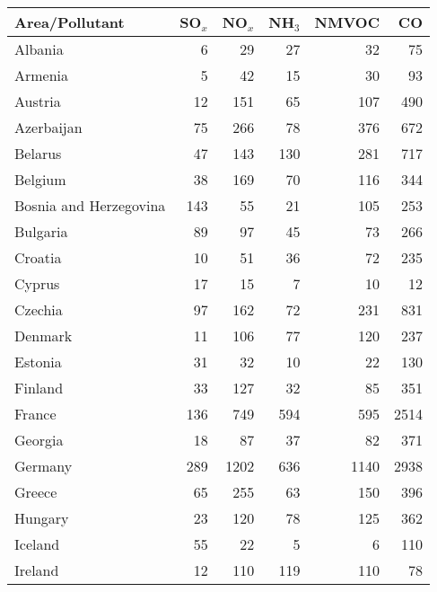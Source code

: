 \begin{table}
\begin{center}
\scriptsize
\begin{tabular}{|l|r|r|r|r|r|}
\hline
 Area/Pollutant&SO$_x$&NO$_x$&NH$_3$&NMVOC&CO\\\hline\hline
                       Albania&     6&    29&    27&    32&    75 \\\hline
                       Armenia&     5&    42&    15&    30&    93 \\\hline
                       Austria&    12&   151&    65&   107&   490 \\\hline
                    Azerbaijan&    75&   266&    78&   376&   672 \\\hline
                       Belarus&    47&   143&   130&   281&   717 \\\hline
                       Belgium&    38&   169&    70&   116&   344 \\\hline
        Bosnia and Herzegovina&   143&    55&    21&   105&   253 \\\hline
                      Bulgaria&    89&    97&    45&    73&   266 \\\hline
                       Croatia&    10&    51&    36&    72&   235 \\\hline
                        Cyprus&    17&    15&     7&    10&    12 \\\hline
                       Czechia&    97&   162&    72&   231&   831 \\\hline
                       Denmark&    11&   106&    77&   120&   237 \\\hline
                       Estonia&    31&    32&    10&    22&   130 \\\hline
                       Finland&    33&   127&    32&    85&   351 \\\hline
                        France&   136&   749&   594&   595&  2514 \\\hline
                       Georgia&    18&    87&    37&    82&   371 \\\hline
                       Germany&   289&  1202&   636&  1140&  2938 \\\hline
                        Greece&    65&   255&    63&   150&   396 \\\hline
                       Hungary&    23&   120&    78&   125&   362 \\\hline
                       Iceland&    55&    22&     5&     6&   110 \\\hline
                       Ireland&    12&   110&   119&   110&    78 \\\hline

\end{tabular}
\end{center}
\end{table}
